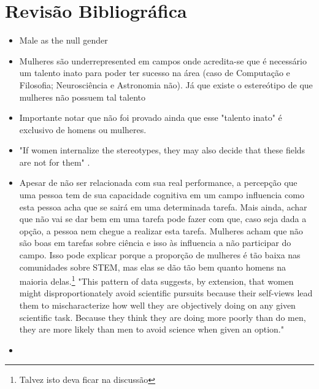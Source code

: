 \chapter{Revisão Bibliográfica}

\begin{itemize}
\item Male as the null gender\cite{fox2006women}
\end{itemize}

\begin{itemize}
	\item Mulheres são underrepresented em campos onde acredita-se que é necessário um talento inato para poder ter sucesso na área (caso de Computação e Filosofia; Neurosciência e Astronomia não)\cite{leslie2015expectations}. Já que existe o estereótipo de que mulheres não possuem tal talento\cite{tiedemann2000gender}\cite{kirkcaldy2007parental} 
	\item Importante notar que não foi provado ainda que esse "talento inato" é exclusivo de homens ou mulheres.\cite{hyde2005gender}
	\item "If women internalize the stereotypes, they may also decide that these fields are not for them" \cite{wigfield2000expectancy}.
	\item Apesar de não ser relacionada com sua real performance, a percepção que uma pessoa tem de sua capacidade cognitiva em um campo influencia como esta pessoa acha que se sairá em uma determinada tarefa. Mais ainda, achar que não vai se dar bem em uma tarefa pode fazer com que, caso seja dada a opção, a pessoa nem chegue a realizar esta tarefa. Mulheres acham que não são boas em tarefas sobre ciência e isso às influencia a não participar do campo.\cite{ehrlinger2003chronic} Isso pode explicar porque a proporção de mulheres é tão baixa nas comunidades sobre STEM, mas elas se dão tão bem quanto homens na maioria delas.\footnote{Talvez isto deva ficar na discussão} "This pattern of data suggests, by extension, that women might disproportionately avoid scientific pursuits because their self-views lead them to mischaracterize how well they are objectively doing on any given scientific task. Because they think they are doing more poorly than do men, they are more likely than men to avoid science when given an option."
	\item 
\end{itemize}


